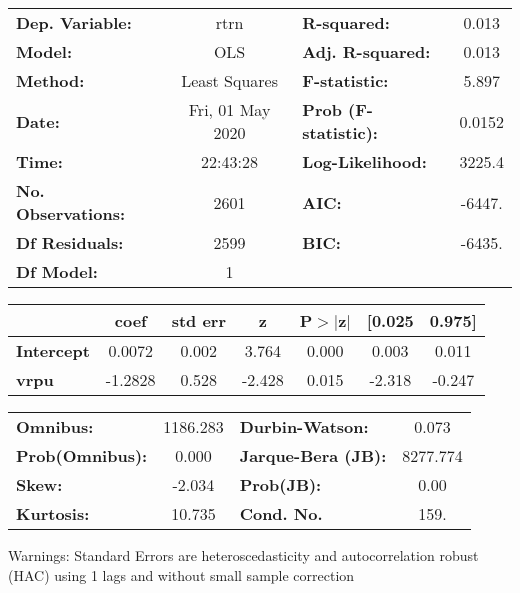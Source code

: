 \begin{center}
\begin{tabular}{lclc}
\toprule
\textbf{Dep. Variable:}    &       rtrn       & \textbf{  R-squared:         } &     0.013   \\
\textbf{Model:}            &       OLS        & \textbf{  Adj. R-squared:    } &     0.013   \\
\textbf{Method:}           &  Least Squares   & \textbf{  F-statistic:       } &     5.897   \\
\textbf{Date:}             & Fri, 01 May 2020 & \textbf{  Prob (F-statistic):} &   0.0152    \\
\textbf{Time:}             &     22:43:28     & \textbf{  Log-Likelihood:    } &    3225.4   \\
\textbf{No. Observations:} &        2601      & \textbf{  AIC:               } &    -6447.   \\
\textbf{Df Residuals:}     &        2599      & \textbf{  BIC:               } &    -6435.   \\
\textbf{Df Model:}         &           1      & \textbf{                     } &             \\
\bottomrule
\end{tabular}
\begin{tabular}{lcccccc}
                   & \textbf{coef} & \textbf{std err} & \textbf{z} & \textbf{P$> |$z$|$} & \textbf{[0.025} & \textbf{0.975]}  \\
\midrule
\textbf{Intercept} &       0.0072  &        0.002     &     3.764  &         0.000        &        0.003    &        0.011     \\
\textbf{vrpu}      &      -1.2828  &        0.528     &    -2.428  &         0.015        &       -2.318    &       -0.247     \\
\bottomrule
\end{tabular}
\begin{tabular}{lclc}
\textbf{Omnibus:}       & 1186.283 & \textbf{  Durbin-Watson:     } &    0.073  \\
\textbf{Prob(Omnibus):} &   0.000  & \textbf{  Jarque-Bera (JB):  } & 8277.774  \\
\textbf{Skew:}          &  -2.034  & \textbf{  Prob(JB):          } &     0.00  \\
\textbf{Kurtosis:}      &  10.735  & \textbf{  Cond. No.          } &     159.  \\
\bottomrule
\end{tabular}
\end{center}

Warnings: \newline
 [1] Standard Errors are heteroscedasticity and autocorrelation robust (HAC) using 1 lags and without small sample correction